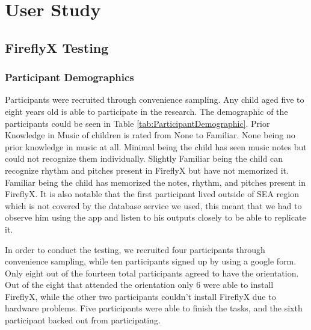 \chapter{User Study}
\section{FireflyX Testing}
\subsection{Participant Demographics}
Participants were recruited through convenience sampling. Any child aged five to eight years old is able to participate in the research. The demographic of the participants could be seen in Table \ref{tab:ParticipantDemographic}. Prior Knowledge in Music of children is rated from None to Familiar. None being no prior knowledge in music at all. Minimal being the child has seen music notes but could not recognize them individually. Slightly Familiar being the child can recognize rhythm and pitches present in FireflyX but have not memorized it. Familiar being the child has memorized the notes, rhythm, and pitches present in FireflyX. It is also notable that the first participant lived outside of SEA region which is not covered by the database service we used, this meant that we had to observe him using the app and listen to his outputs closely to be able to replicate it.

In order to conduct the testing, we recruited four participants through convenience sampling, while ten participants signed up by using a google form. Only eight out of the fourteen total participants agreed to have the orientation. Out of the eight that attended the orientation only 6 were able to install FireflyX, while the other two participants couldn't install FireflyX due to hardware problems. Five participants were able to finish the tasks, and the sixth participant backed out from participating.

